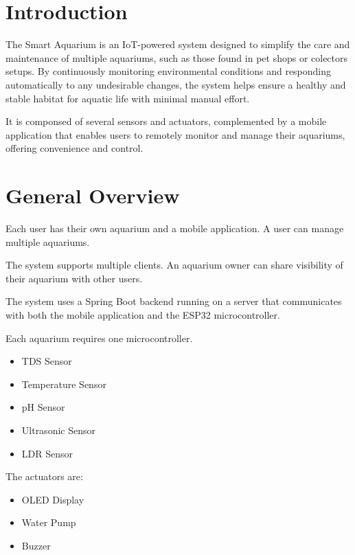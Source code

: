 \documentclass[11pt,a4paper]{article}
\title{\titulo}
\date{\data}
\author{\name\\\studentNumber\\ \institution}
\begin{document}

\maketitle

\section{Introduction}
The Smart Aquarium is an IoT-powered system designed to simplify the care and maintenance of multiple aquariums, such as those found in pet shops or colectors setups. By continuously monitoring environmental conditions and responding automatically to any undesirable changes, the system helps ensure a healthy and stable habitat for aquatic life with minimal manual effort.

It is componsed of several sensors and actuators, complemented by a mobile application that enables users to remotely monitor and manage their aquariums, offering convenience and control.

\section{General Overview}

Each user has their own aquarium and a mobile application. A user can manage multiple aquariums.

The system supports multiple clients. An aquarium owner can share visibility of their aquarium with other users.

The system uses a Spring Boot backend running on a server that communicates with both the mobile application and the ESP32 microcontroller.

Each aquarium requires one microcontroller.

\begin{itemize}
    \setlength\itemsep{0.1em}
    \item TDS Sensor
    \item Temperature Sensor
    \item pH Sensor
    \item Ultrasonic Sensor
    \item LDR Sensor
\end{itemize}

The actuators are:

\begin{itemize}
    \setlength\itemsep{0.1em}
    \item OLED Display
    \item Water Pump
    \item Buzzer
\end{itemize}
\end{document}
